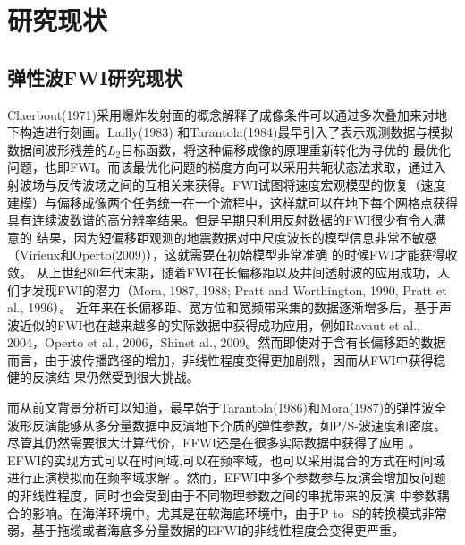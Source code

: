\section{研究现状}
\subsection{弹性波FWI研究现状}
Claerbout(1971\cite{Claerbout1971})采用爆炸发射面的概念解释了成像条件可以通过多次叠加来对地下构造进行刻画。Lailly(1983\cite{lailly1983seismic})
和Tarantola(1984\cite{tarantola1984})最早引入了表示观测数据与模拟数据间波形残差的$L_2$目标函数，将这种偏移成像的原理重新转化为寻优的
最优化问题，也即FWI。而该最优化问题的梯度方向可以采用共轭状态法求取，通过入射波场与反传波场之间的互相关来获得。FWI试图将速度宏观模型的恢复（速度
建模）与偏移成像两个任务统一在一个流程中，这样就可以在地下每个网格点获得具有连续波数谱的高分辨率结果。但是早期只利用反射数据的FWI很少有令人满意的
结果，因为短偏移距观测的地震数据对中尺度波长的模型信息非常不敏感（Virieux和Operto(2009)\cite{virieux2009overview}），这就需要在初始模型非常准确
的时候FWI才能获得收敛。
从上世纪80年代末期，随着FWI在长偏移距以及井间透射波的应用成功，人们才发现FWI的潜力（Mora, 1987\cite{mora:1987}, 1988\cite{mora1988elastic}; Pratt
and Worthington, 1990\cite{PRATTEtAl1990}, Pratt et al., 1996\cite{pratt1996two}）。
近年来在长偏移距、宽方位和宽频带采集的数据逐渐增多后，基于声波近似的FWI也在越来越多的实际数据中获得成功应用，例如Ravaut
et al., 2004\cite{RavautEtAl2004}，Operto et al., 2006\cite{Operto2006}，Shinet al.,
2009\cite{ShinEtAl2009}。然而即使对于含有长偏移距的数据而言，由于波传播路径的增加，非线性程度变得更加剧烈，因而从FWI中获得稳健的反演结
果仍然受到很大挑战\cite{sirgue2006importance,virieux2009overview}。

而从前文背景分析可以知道，最早始于Tarantola(1986)\cite{tarantola:1986}和Mora(1987)\cite{mora:1987}的弹性波全波形反演能够从多分量数据中反演地下介质的弹性参数，如P/S-波速度和密度。
尽管其仍然需要很大计算代价，EFWI还是在很多实际数据中获得了应用
\cite{crase1992nonlinear,djikpesse.tarantola:1999,sears:2008,sears:2010,prieux:2013a,prieux:2013b,vigh:2014}。
EFWI的实现方式可以在时间域\cite{shipp:2002},可以在频率域\cite{brossier2009}，也可以采用混合的方式在时间域进行正演模拟而在频率域求解
\cite{nihei.li:2007,sirgue:2008}。然而，EFWI中多个参数参与反演会增加反问题的非线性程度，同时也会受到由于不同物理参数之间的串扰带来的反演
中参数耦合的影响\cite{forgues.lambare:1997}。在海洋环境中，尤其是在软海底环境中，由于P-to-
S的转换模式非常弱，基于拖缆或者海底多分量数据的EFWI的非线性程度会变得更严重\cite{sears:2008}。

